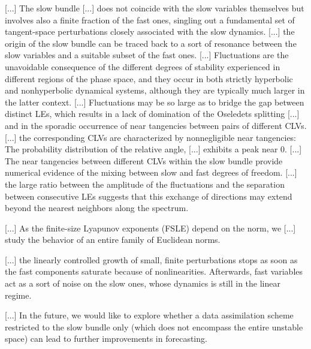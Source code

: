 \begin{description}
{[...] The slow bundle
[...] does not coincide with the slow variables themselves but involves also
a finite fraction of the fast ones, singling out a fundamental set of
tangent-space perturbations closely associated with the slow dynamics.
[...] the origin of the slow bundle can be traced back to a sort of
resonance between the slow variables and a suitable subset of the fast
ones.
[...] Fluctuations are the unavoidable consequence of the different
degrees of stability experienced in different regions of the phase space,
and they occur in both strictly hyperbolic and nonhyperbolic dynamical
systems, although they are typically much larger in the latter context.
[...] Fluctuations may be so large as to bridge the gap between distinct LEs,
which results in a lack of domination of the Oseledets splitting
[...] and in the sporadic occurrence of near tangencies between pairs of
different CLVs.
[...] the corresponding CLVs are characterized by nonnegligible near
tangencies: The probability distribution of the relative angle, [...]
exhibits a peak near 0.
[...] The near tangencies between different CLVs within the slow bundle
provide numerical evidence of the mixing between slow and fast
degrees of freedom.
[...] the large ratio between the amplitude of the fluctuations and the
separation between consecutive LEs suggests that this exchange of
directions may extend beyond the nearest neighbors along the spectrum.

[...] As the finite-size Lyapunov exponents (FSLE) depend on the norm, we
[...] study the behavior of an entire family of Euclidean norms.

[...] the linearly controlled growth of small, finite perturbations stops
as soon as the fast components saturate because of nonlinearities.
Afterwards, fast variables act as a sort of noise on the slow ones, whose
dynamics is still in the linear regime.

[...] In the future, we would like to explore whether a data assimilation
scheme restricted to the slow bundle only (which does not encompass the
entire unstable space) can lead to further improvements in forecasting.
}

\end{description}

\renewcommand{\ssp}{a}
